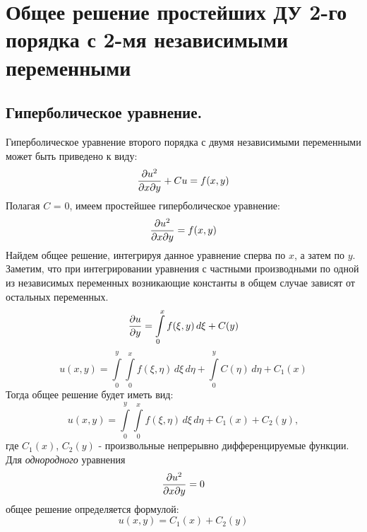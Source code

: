 \documentclass[../main.tex]{subfiles}
\begin{document}
\section{Общее решение простейших ДУ 2-го порядка с 2-мя независимыми переменными}
\subsection{Гиперболическое уравнение.}
Гиперболическое уравнение второго порядка с двумя независимыми переменными может быть приведено к виду:
\[
	\pderivtwo{u}{x}{y} + Cu = f(x, y)
\]
Полагая $C$ = 0, имеем простейшее гиперболическое уравнение:
\begin{equation}
	\pderivtwo{u}{x}{y} = f(x, y)
\end{equation}
Найдем общее решение, интегрируя данное уравнение сперва по $x$, а затем по $y$. \\Заметим, что при интегрировании уравнения с частными производными по одной из независимых переменных возникающие константы в общем случае зависят от остальных переменных.
\[
	\frac{\partial u}{\partial y} = \int\limits_{0}^{x}f(\xi, y)\,d\xi + C(y)
\]
\[
	u(x,y) = \int\limits_{0}^{y}\int\limits_{0}^{x}f(\xi, \eta)\,d\xi\,d\eta + \int\limits_{0}^{y}C(\eta)\,d\eta + C_1(x)
\]
Тогда общее решение будет иметь вид:
\begin{equation}
	u(x,y) = \int\limits_{0}^{y}\int\limits_{0}^{x}f(\xi, \eta)\,d\xi\,d\eta + C_1(x) + C_2(y),
\end{equation}
где $C_1(x)$, $C_2(y)$ - произвольные непрерывно дифференцируемые функции.\\
Для \textit{однородного} уравнения
\[
	\pderivtwo{u}{x}{y} = 0
\]
общее решение определяется формулой:
\[
	u(x,y) = C_1(x) + C_2(y)
\]
\end{document}
